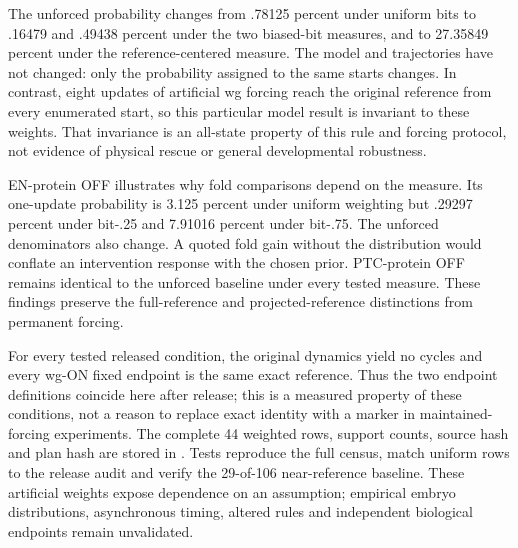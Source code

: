 The unforced probability changes from .78125 percent under uniform bits to .16479 and .49438 percent under the two biased-bit measures, and to 27.35849 percent under the reference-centered measure. The model and trajectories have not changed: only the probability assigned to the same starts changes. In contrast, eight updates of artificial wg forcing reach the original reference from every enumerated start, so this particular model result is invariant to these weights. That invariance is an all-state property of this rule and forcing protocol, not evidence of physical rescue or general developmental robustness.

EN-protein OFF illustrates why fold comparisons depend on the measure. Its one-update probability is 3.125 percent under uniform weighting but .29297 percent under bit-.25 and 7.91016 percent under bit-.75. The unforced denominators also change. A quoted fold gain without the distribution would conflate an intervention response with the chosen prior. PTC-protein OFF remains identical to the unforced baseline under every tested measure. These findings preserve the full-reference and projected-reference distinctions from permanent forcing.

For every tested released condition, the original dynamics yield no cycles and every wg-ON fixed endpoint is the same exact reference. Thus the two endpoint definitions coincide here after release; this is a measured property of these conditions, not a reason to replace exact identity with a marker in maintained-forcing experiments. The complete 44 weighted rows, support counts, source hash and plan hash are stored in . Tests reproduce the full census, match uniform rows to the release audit and verify the 29-of-106 near-reference baseline. These artificial weights expose dependence on an assumption; empirical embryo distributions, asynchronous timing, altered rules and independent biological endpoints remain unvalidated.


